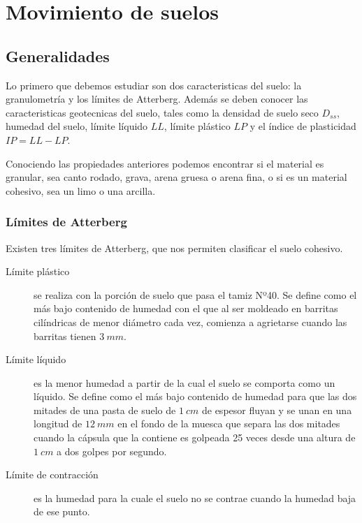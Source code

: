 \documentclass[../main.tex]{subfiles}
\begin{document}
\section{Movimiento de suelos}

\subsection{Generalidades}

Lo primero que debemos estudiar son dos caracteristicas del suelo: la granulometría
y los límites de Atterberg. Además se deben conocer las caracteristicas geotecnicas
del suelo, tales como la densidad de suelo seco $D_{ss}$, humedad del suelo, 
límite líquido $LL$, límite plástico $LP$ y el índice de plasticidad $IP = LL - LP$.

Conociendo las propiedades anteriores podemos encontrar si el material es granular,
sea canto rodado, grava, arena gruesa o arena fina, o si es un material cohesivo,
sea un limo o una arcilla.

\subsubsection{Límites de Atterberg}

Existen tres límites de Atterberg, que nos permiten clasificar el suelo cohesivo.

\begin{description}
  \item[Límite plástico]  se realiza con la porción de suelo que pasa el tamiz 
    Nº40. Se define como el más bajo contenido de humedad con el que al ser moldeado
    en barritas cilíndricas de menor diámetro cada vez, comienza a agrietarse cuando
    las barritas tienen $\SI{3}{mm}$.

  \item[Límite líquido]  es la menor humedad a partir de la cual el suelo se 
    comporta como un líquido. Se define como el más bajo contenido de humedad para
    que las dos mitades de una pasta de suelo de $\SI{1}{cm}$ de espesor fluyan
    y se unan en una longitud de $\SI{12}{mm}$ en el fondo de la muesca que separa
    las dos mitades cuando la cápsula que la contiene es golpeada 25 veces desde
    una altura de $\SI{1}{cm}$ a dos golpes por segundo.

  \item[Límite de contracción] es la humedad para la cuale el suelo no se contrae
    cuando la humedad baja de ese punto.
\end{description}
\end{document}
